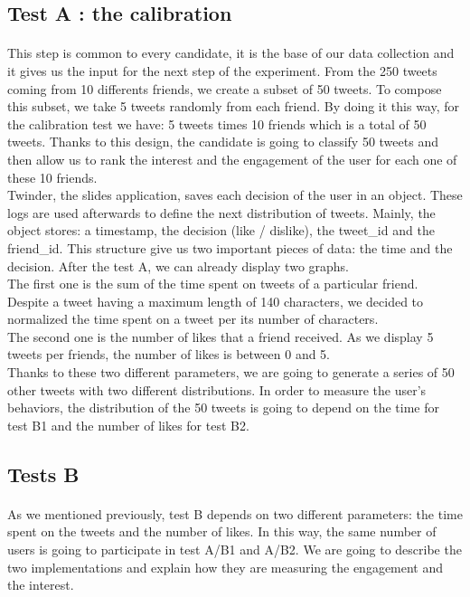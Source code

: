 \subsection{Test A : the calibration }

\paragraph{}
This step is common to every candidate, it is the base of our data collection and it gives us the input for the next step of the experiment. From the 250 tweets coming from 10 differents friends, we create a subset of 50 tweets. To compose this subset, we take 5 tweets randomly from each friend. By doing it this way, for the calibration test we have: 5 tweets times 10 friends which is a total of 50 tweets. Thanks to this design, the candidate is going to classify 50 tweets and then allow us to rank the interest and the engagement of the user for each one of these 10 friends.\\
Twinder, the slides application, saves each decision of the user in an object. These logs are used afterwards to define the next distribution of tweets. Mainly, the object stores: a timestamp, the decision (like / dislike), the tweet\_id and the friend\_id. This structure give us two important pieces of data: the time and the decision. After the test A, we can already display two graphs. \\
The first one is the sum of the time spent on tweets of a particular friend. Despite a tweet having a maximum length of 140 characters, we decided to normalized the time spent on a tweet per its number of characters.\\
The second one is the number of likes that a friend received. As we display 5 tweets per friends, the number of likes is between 0 and 5.\\
Thanks to these two different parameters, we are going to generate a series of 50 other tweets with two different distributions. In order to measure the user's behaviors, the distribution of the 50 tweets is going to depend on the time for test B1 and the number of likes for test B2.\\


\subsection{Tests B}

\paragraph{}
As we mentioned previously, test B depends on two different parameters: the time spent on the tweets and the number of likes. In this way, the same number of users is going to participate in test A/B1 and A/B2. We are going to describe the two implementations and explain how they are measuring the engagement and the interest.

